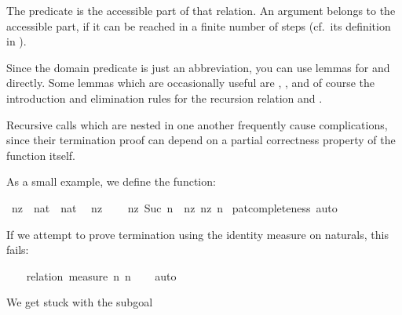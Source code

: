 \begin{isabellebody}
\begin{isamarkuptext}
  The predicate  is the accessible part of
  that relation. An argument belongs to the accessible part, if it can
  be reached in a finite number of steps (cf.~its definition in ).

  Since the domain predicate is just an abbreviation, you can use
  lemmas for  and  directly. Some
  lemmas which are occasionally useful are , , and of course the introduction and elimination rules
  for the recursion relation  and .%
\end{isamarkuptext}%
\isamarkuptrue%
%
\isamarkuptrue%
%
\begin{isamarkuptext}%
Recursive calls which are nested in one another frequently cause
  complications, since their termination proof can depend on a partial
  correctness property of the function itself. 

  As a small example, we define the  function:%
\end{isamarkuptext}%
\isamarkuptrue%
\isamarkupfalse%
\ nz\ {}{}\ {}nat\ {}\ nat{}\isanewline
{}\isanewline
\ \ {}nz\ {}\ {}\ {}{}\isanewline
{}\ {}nz\ {}Suc\ n{}\ {}\ nz\ {}nz\ n{}{}\isanewline
%
\isadelimproof
%
\endisadelimproof
%
\isatagproof
{}\isamarkupfalse%
\ pat{}completeness\ auto%
\endisatagproof
{\isafoldproof}%
%
\isadelimproof
%
\endisadelimproof
%
\begin{isamarkuptext}%
If we attempt to prove termination using the identity measure on
  naturals, this fails:%
\end{isamarkuptext}%
\isamarkuptrue%
\isamarkupfalse%
\isanewline
%
\isadelimproof
\ \ %
\endisadelimproof
%
\isatagproof
{}\isamarkupfalse%
\ {}relation\ {}measure\ {}{}n{}\ n{}{}{}\isanewline
\ \ \isamarkupfalse%
\ auto%
\begin{isamarkuptxt}%
We get stuck with the subgoal


\end{isamarkuptxt}
\end{isabellebody}
